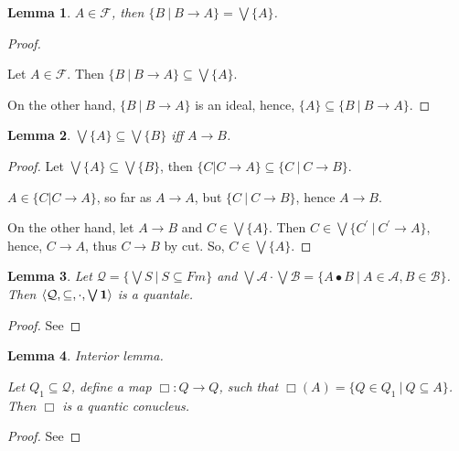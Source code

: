 \documentclass[a4paper]{article}
\newtheorem{lemma}{Lemma}
\begin{document}
\begin{lemma}
  $A \in \mathcal{F}$, then $\{ B \: | \: B \rightarrow A \} = \bigvee \{ A \}$.
\end{lemma}

\begin{proof}
$ $

Let $A \in \mathcal{F}$. Then $\{ B \: | \: B \rightarrow A \} \subseteq \bigvee \{ A \}$.

On the other hand, $\{ B \: | \: B \rightarrow A \}$ is an ideal, hence, $\{ A \} \subseteq \{ B \: | \: B \rightarrow A \}$.
\end{proof}

\begin{lemma}
  $\bigvee \{ A\} \subseteq \bigvee \{ B \}$ iff $A \rightarrow B$.
\end{lemma}

\begin{proof}
  Let $\bigvee \{ A\} \subseteq \bigvee \{ B \}$,
  then $\{ C | C \rightarrow A\} \subseteq \{ C \: | \: C \rightarrow B \}$.

  $A \in \{ C | C \rightarrow A\}$, so far as $A \rightarrow A$, but $\{ C \: | \: C \rightarrow B \}$,
  hence $A \rightarrow B$.

  On the other hand, let $A \rightarrow B$ and $C \in \bigvee \{ A\}$.
  Then $C \in \bigvee \{ C^{'} \: | \: C^{'} \rightarrow A \}$, hence, $C \rightarrow A$, thus
  $C \rightarrow B$ by cut. So, $C \in \bigvee \{ A \}$.

\end{proof}

\begin{lemma}
  Let $\mathcal{Q} = \{ \bigvee S \: | \: S \subseteq Fm \}$ and $\bigvee \mathcal{A} \cdot \bigvee \mathcal{B} =
  \{ A \bullet B \: | \: A \in \mathcal{A}, B \in \mathcal{B} \}$.
  Then $\langle \mathcal{Q}, \subseteq, \cdot, \bigvee{{\bf 1}}\rangle$ is a quantale.
\end{lemma}

\begin{proof}
  See
\end{proof}

\begin{lemma} Interior lemma.
$ $

Let $Q_1 \subseteq \mathcal{Q}$, define a map $\Box : Q \to Q$, such that $\Box(A) = \{  Q \in Q_1 \: | \: Q \subseteq A \}$.
Then $\Box$ is a quantic conucleus.
\end{lemma}

\begin{proof}
  See
\end{proof}
\end{document}
